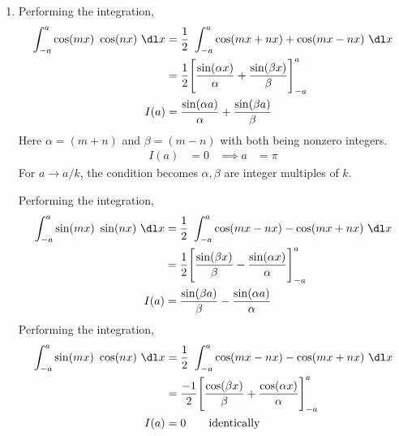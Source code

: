 \begin{enumerate}
    \item Performing the integration,
          \begin{align}
              \int_{-a}^{a} \cos(mx)\ \cos(nx)\ \dl x &
              = \frac{1}{2}\ \int_{-a}^{a} \cos(mx + nx)
              + \cos(mx - nx)\ \dl x                    \\
                                                      &
              = \frac{1}{2}\Bigg[ \frac{\sin(\alpha x)}{\alpha}
                  + \frac{\sin(\beta x)}{\beta}
              \Bigg]_{-a}^{a}                           \\
              I(a)                                    &
              = \frac{\sin(\alpha a)}{\alpha} + \frac{\sin(\beta a)}{\beta}
          \end{align}
          Here $ \alpha = (m+n) $ and $ \beta = (m-n) $ with both being nonzero integers.
          \begin{align}
              I(a)       & = 0   &
              \implies a & = \pi
          \end{align}
          For $ a \to a/k $, the condition becomes $ \alpha, \beta $ are
          integer multiples of $ k $. \par
          Performing the integration,
          \begin{align}
              \int_{-a}^{a} \sin(mx)\ \sin(nx)\ \dl x &
              = \frac{1}{2}\ \int_{-a}^{a} \cos(mx - nx)
              - \cos(mx + nx)\ \dl x                    \\
                                                      &
              = \frac{1}{2}\Bigg[ \frac{\sin(\beta x)}{\beta}
                  - \frac{\sin(\alpha x)}{\alpha}
              \Bigg]_{-a}^{a}                           \\
              I(a)                                    &
              = \frac{\sin(\beta a)}{\beta} - \frac{\sin(\alpha a)}{\alpha}
          \end{align}
          Performing the integration,
          \begin{align}
              \int_{-a}^{a} \sin(mx)\ \cos(nx)\ \dl x &
              = \frac{1}{2}\ \int_{-a}^{a} \cos(mx - nx)
              - \cos(mx + nx)\ \dl x                    \\
                                                      &
              = \frac{-1}{2}\Bigg[ \frac{\cos(\beta x)}{\beta}
                  + \frac{\cos(\alpha x)}{\alpha}
              \Bigg]_{-a}^{a}                           \\
              I(a)                                    &
              = 0 \qquad \text{identically}
          \end{align}


\end{enumerate}
